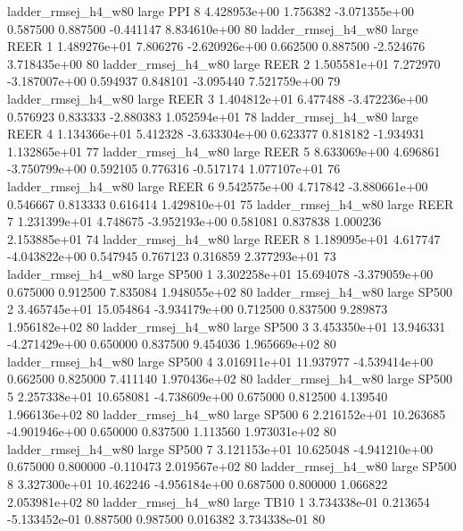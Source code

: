 ladder_rmsej_h4_w80      large      PPI                 8 4.428953e+00      1.756382 -3.071355e+00 0.587500 0.887500      -0.441147 8.834610e+00 80
ladder_rmsej_h4_w80      large     REER                 1 1.489276e+01      7.806276 -2.620926e+00 0.662500 0.887500      -2.524676 3.718435e+00 80
ladder_rmsej_h4_w80      large     REER                 2 1.505581e+01      7.272970 -3.187007e+00 0.594937 0.848101      -3.095440 7.521759e+00 79
ladder_rmsej_h4_w80      large     REER                 3 1.404812e+01      6.477488 -3.472236e+00 0.576923 0.833333      -2.880383 1.052594e+01 78
ladder_rmsej_h4_w80      large     REER                 4 1.134366e+01      5.412328 -3.633304e+00 0.623377 0.818182      -1.934931 1.132865e+01 77
ladder_rmsej_h4_w80      large     REER                 5 8.633069e+00      4.696861 -3.750799e+00 0.592105 0.776316      -0.517174 1.077107e+01 76
ladder_rmsej_h4_w80      large     REER                 6 9.542575e+00      4.717842 -3.880661e+00 0.546667 0.813333       0.616414 1.429810e+01 75
ladder_rmsej_h4_w80      large     REER                 7 1.231399e+01      4.748675 -3.952193e+00 0.581081 0.837838       1.000236 2.153885e+01 74
ladder_rmsej_h4_w80      large     REER                 8 1.189095e+01      4.617747 -4.043822e+00 0.547945 0.767123       0.316859 2.377293e+01 73
ladder_rmsej_h4_w80      large    SP500                 1 3.302258e+01     15.694078 -3.379059e+00 0.675000 0.912500       7.835084 1.948055e+02 80
ladder_rmsej_h4_w80      large    SP500                 2 3.465745e+01     15.054864 -3.934179e+00 0.712500 0.837500       9.289873 1.956182e+02 80
ladder_rmsej_h4_w80      large    SP500                 3 3.453350e+01     13.946331 -4.271429e+00 0.650000 0.837500       9.454036 1.965669e+02 80
ladder_rmsej_h4_w80      large    SP500                 4 3.016911e+01     11.937977 -4.539414e+00 0.662500 0.825000       7.411140 1.970436e+02 80
ladder_rmsej_h4_w80      large    SP500                 5 2.257338e+01     10.658081 -4.738609e+00 0.675000 0.812500       4.139540 1.966136e+02 80
ladder_rmsej_h4_w80      large    SP500                 6 2.216152e+01     10.263685 -4.901946e+00 0.650000 0.837500       1.113560 1.973031e+02 80
ladder_rmsej_h4_w80      large    SP500                 7 3.121153e+01     10.625048 -4.941210e+00 0.675000 0.800000      -0.110473 2.019567e+02 80
ladder_rmsej_h4_w80      large    SP500                 8 3.327300e+01     10.462246 -4.956184e+00 0.687500 0.800000       1.066822 2.053981e+02 80
ladder_rmsej_h4_w80      large     TB10                 1 3.734338e-01      0.213654 -5.133452e-01 0.887500 0.987500       0.016382 3.734338e-01 80
